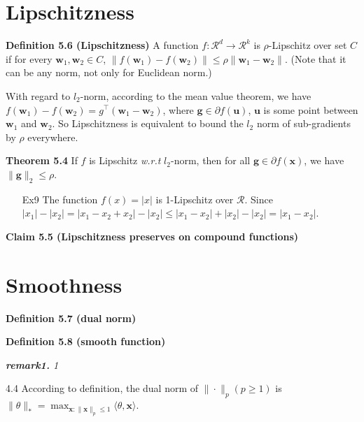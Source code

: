 \documentclass{article}
\begin{document}
\section{Lipschitzness}

	\textbf{Definition 5.6 (Lipschitzness)} A function $f: \mathcal{R}^d\rightarrow \mathcal{R}^k$ is $\rho$-Lipschitz over set $C$ if for every $\mathbf{w}_1, \mathbf{w}_2 \in C$, $\|f(\mathbf{w}_1) - f(\mathbf{w}_2)\| \leq \rho \|\mathbf{w}_1 - \mathbf{w}_2\|$. (Note that it can be any norm, not only for Euclidean norm.)
	
	With regard to $l_2$-norm, according to the mean value theorem, we have $f(\mathbf{w}_1)-f(\mathbf{w}_2)=g^\top (\mathbf{w}_1-\mathbf{w}_2)$, where $\mathbf{g}\in\partial f(\mathbf{u})$, $\mathbf{u}$ is some point between $\mathbf{w}_1$ and $\mathbf{w}_2$. So Lipschitzness is equivalent to bound the $l_2$ norm of sub-gradients by $\rho$ everywhere.
 	
	\textbf{Theorem 5.4} If $f$ is Lipschitz \textit{w.r.t} $l_2$-norm, then for all $\mathbf{g}\in\partial f(\mathbf{x})$, we have $\|\mathbf{g}\|_2\leq \rho$.
	\begin{itemize}
	\item[Ex9] The function $f(x) = |x|$ is 1-Lipschitz over $\mathcal{R}$. Since $|x_1|-|x_2|=|x_1-x_2+x_2|-|x_2|\leq |x_1-x_2|+|x_2|-|x_2|=|x_1-x_2|$.
	\end{itemize}
	\textbf{Claim 5.5 (Lipschitzness preserves on compound functions)}

	
\section{Smoothness}

	\noindent\textbf{Definition 5.7 (dual norm)}
	
	\noindent\textbf{Definition 5.8 (smooth function)}

	\begin{framed}
	\begin{scriptsize}
	\begin{spacing}{1.2}
	\noindent\textit{\textbf{remark1.} 1}
	\end{spacing}
	\end{scriptsize}
	\end{framed}


\newpage

4.4 According to definition, the dual norm of $\|\cdot\|_p(p\geq 1)$ is $\|\theta\|_*=\max_{\mathbf{x}:\|\mathbf{x}\|_p\leq 1} \langle\theta,\mathbf{x}\rangle$. 
\end{document}
